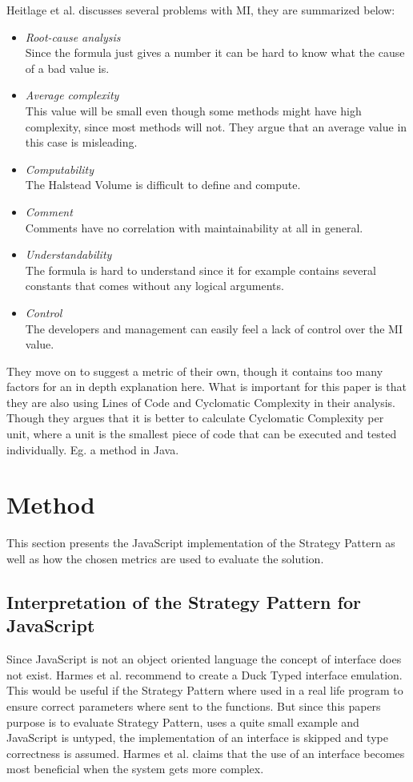 \documentclass[conference, a4paper]{IEEEtran}
\begin{document}
Heitlage et al. discusses several problems with MI, they are summarized below:
\begin{itemize}
    \item \emph{Root-cause analysis} \\
    Since the formula just gives a number it can be hard to know what the cause of a bad value is.
    \item \emph{Average complexity} \\
    This value will be small even though some methods might have high complexity, since most methods will not. They argue that an average value in this case is misleading.
    \item \emph{Computability} \\
		The Halstead Volume is difficult to define and compute.
    \item \emph{Comment} \\
		Comments have no correlation with maintainability at all in general.
    \item \emph{Understandability} \\
		The formula is hard to understand since it for example contains several constants that comes without any logical arguments.
		\item \emph{Control} \\
		The developers and management can easily feel a lack of control over the MI value.
\end{itemize}
They move on to suggest a metric of their own, though it contains too many factors for an in depth explanation here. What is important for this paper is that they are also using Lines of Code and Cyclomatic Complexity in their analysis. Though they argues that it is better to calculate Cyclomatic Complexity per unit, where a unit is the smallest piece of code that can be executed and tested individually. Eg. a method in Java.~\cite{bibitem:Maintainability}

\section{Method}
This section presents the JavaScript implementation of the Strategy Pattern as well as how the chosen metrics are used to evaluate the solution.

\subsection{Interpretation of the Strategy Pattern for JavaScript}
\label{sec:JavaScript}
Since JavaScript is not an object oriented language the concept of interface does not exist. Harmes et al. recommend to create a Duck Typed interface emulation. This would be useful if the Strategy Pattern where used in a real life program to ensure correct parameters where sent to the functions. But since this papers purpose is to evaluate Strategy Pattern, uses a quite small example and JavaScript is untyped, the implementation of an interface is skipped and type correctness is assumed. Harmes et al. claims that the use of an interface becomes most beneficial when the system gets more complex.~\cite{bibitem:DiazHarmes}
\end{document}
